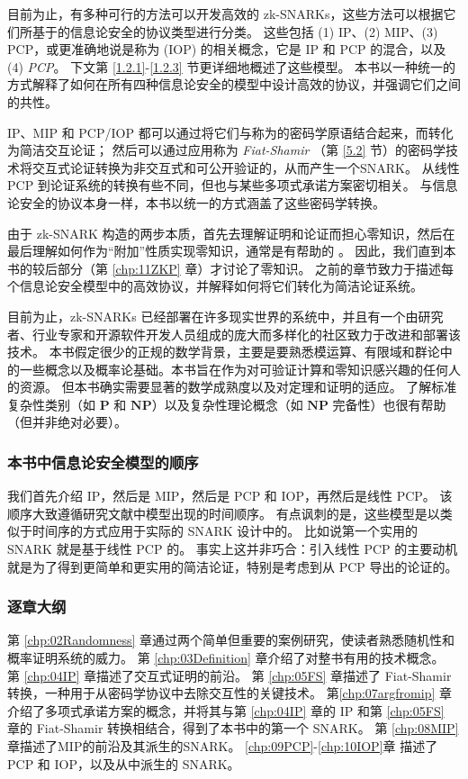 目前为止，有多种可行的方法可以开发高效的 zk-SNARKs，这些方法可以根据它们所基于的信息论安全的协议类型进行分类。 这些包括 (1) IP、(2) MIP、(3) PCP，或更准确地说是称为 (IOP) 的相关概念，它是 IP 和 PCP 的混合，以及 (4) \emph{PCP}。 下文第 \ref{1.2.1}-\ref{1.2.3} 节更详细地概述了这些模型。 本书以一种统一的方式解释了如何在所有四种信息论安全的模型中设计高效的协议，并强调它们之间的共性。

IP、MIP 和 PCP/IOP 都可以通过将它们与称为的密码学原语结合起来，而转化为简洁交互论证； 然后可以通过应用称为 \emph{Fiat-Shamir} （第 \ref{5.2} 节）的密码学技术将交互式论证转换为非交互式和可公开验证的，从而产生一个SNARK。 从线性 PCP 到论证系统的转换有些不同，但也与某些多项式承诺方案密切相关。 与信息论安全的协议本身一样，本书以统一的方式涵盖了这些密码学转换。

由于 zk-SNARK 构造的两步本质，首先去理解证明和论证而担心零知识，然后在最后理解如何作为“附加”性质实现零知识，通常是有帮助的 。
因此，我们直到本书的较后部分（第 \ref{chp:11ZKP} 章）才讨论了零知识。 
之前的章节致力于描述每个信息论安全模型中的高效协议，并解释如何将它们转化为简洁论证系统。

目前为止，zk-SNARKs 已经部署在许多现实世界的系统中，并且有一个由研究者、行业专家和开源软件开发人员组成的庞大而多样化的社区致力于改进和部署该技术。 本书假定很少的正规的数学背景，主要是要熟悉模运算、有限域和群论中的一些概念以及概率论基础。本书旨在作为对可验证计算和零知识感兴趣的任何人的资源。 但本书确实需要显著的数学成熟度以及对定理和证明的适应。 
了解标准复杂性类别（如 $\mathbf{P}$ 和 $\mathbf{NP}$）以及复杂性理论概念（如 $\mathbf{NP}$ 完备性）也很有帮助（但并非绝对必要）。


\subsubsection{本书中信息论安全模型的顺序} 
我们首先介绍 IP，然后是 MIP，然后是 PCP 和 IOP，再然后是线性 PCP。 该顺序大致遵循研究文献中模型出现的时间顺序。 有点讽刺的是，这些模型是以类似于时间序的方式应用于实际的 SNARK 设计中的。 比如说第一个实用的 SNARK 就是基于线性 PCP 的。 事实上这并非巧合：引入线性 PCP 的主要动机就是为了得到更简单和更实用的简洁论证，特别是考虑到从 PCP 导出的论证的。


\subsubsection{逐章大纲}
第 \ref{chp:02Randomness} 章通过两个简单但重要的案例研究，使读者熟悉随机性和概率证明系统的威力。 第 \ref{chp:03Definition} 章介绍了对整书有用的技术概念。 第 \ref{chp:04IP} 章描述了交互式证明的前沿。 第 \ref{chp:05FS} 章描述了 Fiat-Shamir 转换，一种用于从密码学协议中去除交互性的关键技术。 第\ref{chp:07argfromip} 章介绍了多项式承诺方案的概念，并将其与第 \ref{chp:04IP} 章的 IP 和第 \ref{chp:05FS} 章的 Fiat-Shamir 转换相结合，得到了本书中的第一个 SNARK。 第 \ref{chp:08MIP} 章描述了MIP的前沿及其派生的SNARK。 
\ref{chp:09PCP}-\ref{chp:10IOP}章 描述了 PCP 和 IOP，以及从中派生的 SNARK。

